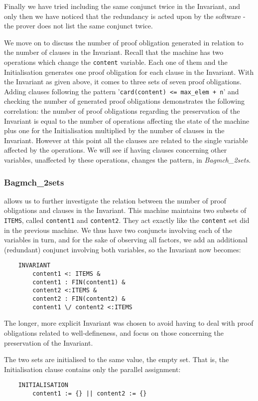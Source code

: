 \documentclass[11pt,journal]{IEEEtran}
\begin{document}
	Finally we have tried including the same conjunct twice in the Invariant, and only then we have noticed that the redundancy is acted upon by the software - the prover does not list the same conjunct twice. 
	
	We move on to discuss the number of proof obligation generated in relation to the number of clauses in the Invariant. Recall that the machine has two operations which change the \texttt{content} variable. Each one of them and the Initialisation generates one proof obligation for each clause in the Invariant. With the Invariant as given above, it comes to three sets of seven proof obligations. Adding clauses following the pattern '\texttt{card(content) <= max\_elem + n}' and checking the number of generated proof obligations demonstrates the following correlation: the number of proof obligations regarding the preservation of the Invariant is equal to the number of operations affecting the state of the machine plus one for the Initialisation multiplied by the number of clauses in the Invariant. However at this point all the clauses are related to the single variable affected by the operations. We will see if having clauses concerning other variables, unaffected by these operations, changes the pattern, in \emph{Bagmch\_2sets}.
	
	\subsubsection{Bagmch\_2sets} allows us to further investigate the relation between the number of proof obligations and clauses in the Invariant. This machine maintains two subsets of \texttt{ITEMS}, called \texttt{content1} and \texttt{content2}. They act exactly like the \texttt{content} set did in the previous machine. We thus have two conjuncts involving each of the variables in turn, and for the sake of observing all factors, we add an additional (redundant) conjunct involving both variables, so the Invariant now becomes:
	
	\begin{lstlisting}
	INVARIANT
		content1 <: ITEMS &
		content1 : FIN(content1) &
		content2 <:ITEMS &
		content2 : FIN(content2) &
		content1 \/ content2 <:ITEMS
	\end{lstlisting}
	The longer, more explicit Invariant was chosen to avoid having to deal with proof obligations related to well-defineness, and focus on those concerning the preservation of the Invariant.
	
	The two sets are initialised to the same value, the empty set. That is, the Initialisation clause contains only the parallel assignment: 
	\begin{lstlisting}
	INITIALISATION
		content1 := {} || content2 := {}
	\end{lstlisting}
	
\end{document}
